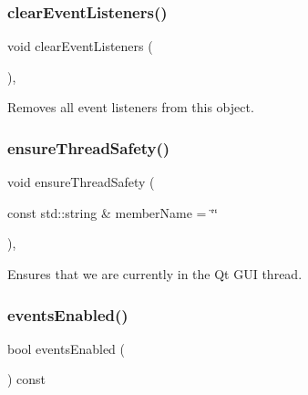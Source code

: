\subsubsection{\texorpdfstring{clear\+Event\+Listeners()}{clearEventListeners()}}
{\footnotesize\ttfamily void clear\+Event\+Listeners (\begin{DoxyParamCaption}{ }\end{DoxyParamCaption})\hspace{0.3cm}{\ttfamily [protected]}, {\ttfamily [virtual]}}



Removes all event listeners from this object. 

\mbox{\label{classGObservable_a284f31528c0520f8e545c03ac9eeac74}} 
\subsubsection{\texorpdfstring{ensure\+Thread\+Safety()}{ensureThreadSafety()}}
{\footnotesize\ttfamily void ensure\+Thread\+Safety (\begin{DoxyParamCaption}\item[{const std\+::string \&}]{member\+Name = {\ttfamily \char`\"{}\char`\"{}} }\end{DoxyParamCaption})\hspace{0.3cm}{\ttfamily [protected]}, {\ttfamily [virtual]}}



Ensures that we are currently in the Qt G\+UI thread. 

\mbox{\label{classGObservable_a8ebb3da91032e7f4c34485dabc518b8a}} 
\subsubsection{\texorpdfstring{events\+Enabled()}{eventsEnabled()}}
{\footnotesize\ttfamily bool events\+Enabled (\begin{DoxyParamCaption}{ }\end{DoxyParamCaption}) const\hspace{0.3cm}{\ttfamily [virtual]}}



